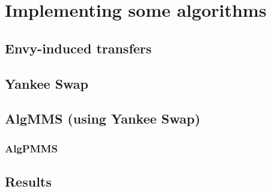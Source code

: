 \chapter{Implementing some algorithms}
\label{chap:yankee-swap}
\section{Envy-induced transfers}
\section{Yankee Swap}
\section{AlgMMS (using Yankee Swap)}
\subsection{AlgPMMS}

\section{Results}
\label{chap:results}